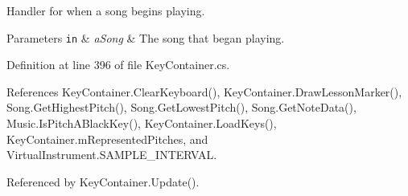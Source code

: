 Handler for when a song begins playing. 


\begin{DoxyParams}[1]{Parameters}
\mbox{\tt in}  & {\em a\+Song} & The song that began playing. \\
\hline
\end{DoxyParams}


Definition at line 396 of file Key\+Container.\+cs.



References Key\+Container.\+Clear\+Keyboard(), Key\+Container.\+Draw\+Lesson\+Marker(), Song.\+Get\+Highest\+Pitch(), Song.\+Get\+Lowest\+Pitch(), Song.\+Get\+Note\+Data(), Music.\+Is\+Pitch\+A\+Black\+Key(), Key\+Container.\+Load\+Keys(), Key\+Container.\+m\+Represented\+Pitches, and Virtual\+Instrument.\+S\+A\+M\+P\+L\+E\+\_\+\+I\+N\+T\+E\+R\+V\+AL.



Referenced by Key\+Container.\+Update().


